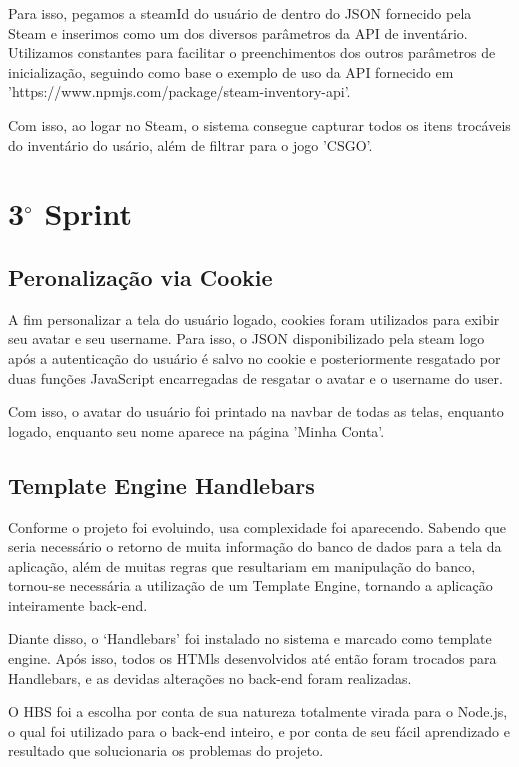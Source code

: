 \documentclass[a4paper,12pt]{article}
\begin{document}
    Para isso, pegamos a steamId do usuário de dentro do JSON fornecido pela Steam e inserimos como um dos diversos parâmetros da API de 
    inventário. Utilizamos constantes para facilitar o preenchimentos dos outros parâmetros de inicialização, seguindo como base o 
    exemplo de uso da API fornecido em 'https://www.npmjs.com/package/steam-inventory-api'.

    Com isso, ao logar no Steam, o sistema consegue capturar todos os itens trocáveis do inventário do usário, 
    além de filtrar para o jogo 'CSGO'.


    \section{3$^{\circ}$ Sprint}
    \subsection{Peronalização via Cookie}
    A fim personalizar a tela do usuário logado, cookies foram utilizados para 
    exibir seu avatar e seu username. Para isso, o JSON disponibilizado pela steam logo 
    após a autenticação do usuário é salvo no cookie e posteriormente resgatado por duas 
    funções JavaScript encarregadas de resgatar o avatar e o username do user.

    Com isso, o avatar do usuário foi printado na navbar de todas as telas, enquanto logado, enquanto seu nome 
    aparece na página 'Minha Conta'.

    \subsection{Template Engine Handlebars}
    Conforme o projeto foi evoluindo, usa complexidade foi aparecendo. Sabendo que seria necessário o retorno 
    de muita informação do banco de dados para a tela da aplicação, além de muitas regras que resultariam 
    em manipulação do banco, tornou-se necessária a utilização de um Template Engine, tornando a aplicação 
    inteiramente back-end. 
    
    Diante disso, o ‘Handlebars’ foi instalado no sistema e marcado como template engine. Após isso, todos 
    os HTMls desenvolvidos até então foram trocados para Handlebars, e as devidas alterações no back-end 
    foram realizadas.
    
    O HBS foi a escolha por conta de sua natureza totalmente virada para o Node.js, o qual foi utilizado 
    para o back-end inteiro, e por conta de seu fácil aprendizado e resultado que solucionaria os 
    problemas do projeto.
\end{document}
